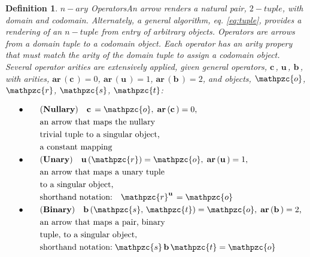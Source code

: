\documentclass[aps,twocolumn,secnumarabic,nobalancelastpage,amsmath,amssymb,
amsthm,nofootinbib,parskip=full]{revtex4}
\numberwithin{equation}{section}
\newtheorem{definition}{Definition}[section]
\newcommand{\obk}[1]{\mathpzc{#1}}
\newcommand{\oper}[1]{\mathbf{#1}\,}
\newcommand{\cpair}[2]{(\obk{#1},\,\obk{#2})}
\begin{document}
 \begin{definition}{$n-ary$ Operators}\label{def:n-ary}
  An arrow renders a natural pair, $2-tuple$, with domain and codomain.
  Alternately, a general algorithm, eq. \ref{eq:tuple},
  provides a rendering of an $n-tuple$ from entry of arbitrary objects.
  Operators are arrows from a domain tuple to a codomain object.
  Each operator has an arity propery that must match the arity
  of the domain tuple to assign a codomain object.
  Several operator arities are extensively applied,
  given general operators, $\oper{c}$, $\oper{u}$, $\oper{b}$,
  with arities, $\oper{ar}(\oper{c})=0$, $\oper{ar}(\oper{u})=1$,
  $\oper{ar}(\oper{b})=2$,
  and objects, $\obk{o}$, $\obk{r}$, $\obk{s}$, $\obk{t}$:

  \begin{equation*}
    \begin{array}{ll}
      \quad\bullet\quad&\mathbf{(Nullary)}\quad\oper{c}=\obk{o},
                         \;\oper{ar}(\oper{c})=0\text{,} \\[3pt]
                  \quad&\text{an arrow that maps the nullary} \\[3pt]
                  \quad&\text{trivial tuple to a singular object,} \\[3pt]
                  \quad&\text{a constant mapping} \\[3pt]
      \quad\bullet\quad&\mathbf{(Unary)}\quad\oper{u}(\obk{r})=\obk{o},
                         \;\oper{ar}(\oper{u})=1\text{,} \\[3pt]
                  \quad&\text{an arrow that maps a unary tuple} \\[3pt]
      \quad&\text{to a singular object,} \\[3pt]
      \quad&\text{shorthand notation:}\quad\obk{r}^{\oper{u}}=\obk{o} \\[3pt]
      \quad\bullet\quad&\mathbf{(Binary)}\quad\oper{b}\cpair{s}{t}=\obk{o},
                         \;\oper{ar}(\oper{b})=2\text{,} \\[3pt]
                  \quad&\text{an arrow that maps a pair, binary} \\[3pt]
                  \quad&\text{tuple, to a singular object,} \\[3pt]
                  \quad&\text{shorthand notation:}
                                \;\obk{s}\,\oper{b}\obk{t}=\obk{o}
    \end{array}
  \end{equation*}  
\end{definition}
\end{document}
